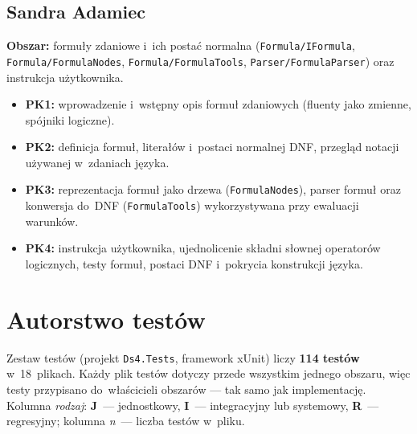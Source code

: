 \documentclass[11pt,a4paper]{article}
\begin{document}
\subsection*{Sandra Adamiec}
\textbf{Obszar:} formuły zdaniowe i~ich postać normalna (\texttt{Formula/IFormula}, \texttt{Formula/FormulaNodes}, \texttt{Formula/FormulaTools}, \texttt{Parser/FormulaParser}) oraz instrukcja użytkownika.
\begin{itemize}\setlength\itemsep{0.1em}
  \item \textbf{PK1:} wprowadzenie i~wstępny opis formuł zdaniowych (fluenty jako zmienne, spójniki logiczne).
  \item \textbf{PK2:} definicja formuł, literałów i~postaci normalnej DNF, przegląd notacji używanej w~zdaniach języka.
  \item \textbf{PK3:} reprezentacja formuł jako drzewa (\texttt{FormulaNodes}), parser formuł oraz konwersja do~DNF (\texttt{FormulaTools}) wykorzystywana przy ewaluacji warunków.
  \item \textbf{PK4:} instrukcja użytkownika, ujednolicenie składni słownej operatorów logicznych, testy formuł, postaci DNF i~pokrycia konstrukcji języka.
\end{itemize}

\section*{Autorstwo testów}

Zestaw testów (projekt \texttt{Ds4.Tests}, framework xUnit) liczy \textbf{114
testów} w~18~plikach. Każdy plik testów dotyczy przede wszystkim jednego
obszaru, więc testy przypisano do~właścicieli obszarów --- tak samo jak
implementację.
Kolumna \textit{rodzaj}: \textbf{J}~--- jednostkowy, \textbf{I}~--- integracyjny
lub systemowy, \textbf{R}~--- regresyjny; kolumna \textit{n}~--- liczba testów
w~pliku.
\end{document}

